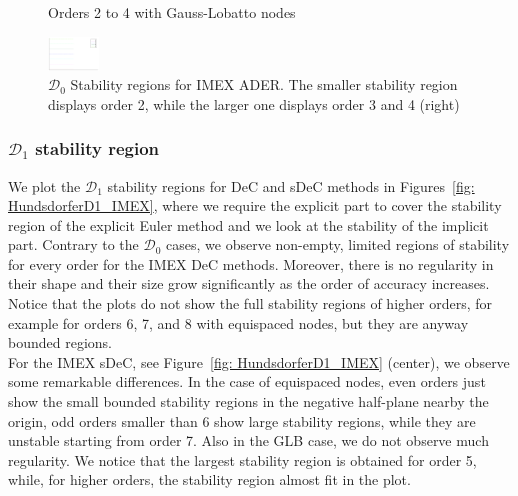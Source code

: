 \begin{figure}
\begin{minipage}[t]{0.4\textwidth}
		\centerline{Orders 2 to 4 with Gauss-Lobatto nodes}
	\end{minipage}
	\includegraphics[width=0.12\textwidth, trim={491 230 30 23}, clip]{pdf/odepics/colors_a-d_new_2-8_no_order.pdf}
	\caption{$\mathcal{D}_0$ Stability regions for IMEX ADER. The smaller stability region displays order 2, while the larger one displays order 3 and 4 (right)}
\label{fig: HundsdorferD0_IMEXADER}
\end{figure}

\subsubsection*{$\mathcal{D}_1$ stability region}
We plot the $\mathcal{D}_1$ stability regions for DeC and sDeC methods in Figures~\ref{fig: HundsdorferD1_IMEX}, where we require the explicit part to cover the stability region of the explicit Euler method and we look at the stability of the implicit part.
Contrary to the $\mathcal{D}_0$ cases, we observe non-empty, limited regions of stability for every order for the IMEX DeC methods. Moreover, there is no regularity in their shape and their size grow significantly as the order of accuracy increases.
Notice that the plots do not show the full stability regions of higher orders, for example for orders 6, 7, and 8 with equispaced nodes, but they are anyway bounded regions. \\
For the IMEX sDeC, see Figure~\ref{fig: HundsdorferD1_IMEX} (center), we observe some remarkable differences. In the case of equispaced nodes, even orders just show the small bounded stability regions in the negative half-plane nearby the origin, odd orders smaller than 6 show large stability regions, while they are unstable starting from order 7. 
Also in the GLB case, we do not observe much regularity. 
We notice that the largest stability region is obtained for order 5, while, for higher orders, the stability region almost fit in the plot.
